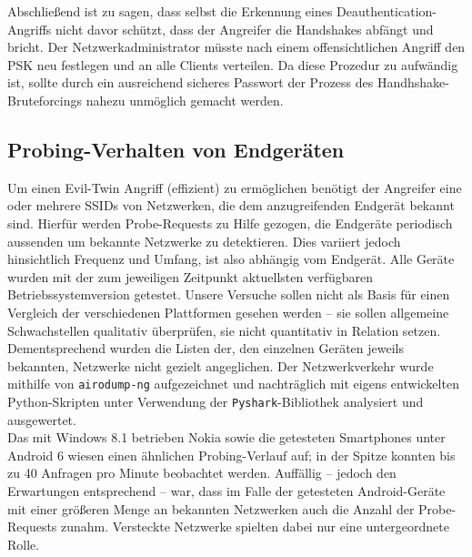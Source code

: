 Abschließend ist zu sagen, dass selbst die Erkennung eines Deauthentication-Angriffs nicht davor schützt, dass der Angreifer die Handshakes abfängt und bricht.
Der Netzwerkadministrator müsste nach einem offensichtlichen Angriff den PSK neu festlegen und an alle Clients verteilen.
Da diese Prozedur zu aufwändig ist, sollte durch ein ausreichend sicheres Passwort der Prozess des Handhshake-Bruteforcings nahezu unmöglich gemacht werden.




\subsection{Probing-Verhalten von Endgeräten}\label{subs:praxisprobes}
Um einen Evil-Twin Angriff (effizient) zu ermöglichen benötigt der Angreifer eine oder mehrere SSIDs von Netzwerken, die dem anzugreifenden Endgerät bekannt sind.
Hierfür werden Probe-Requests zu Hilfe gezogen, die Endgeräte periodisch aussenden um bekannte Netzwerke zu detektieren.
Dies variiert jedoch hinsichtlich Frequenz und Umfang, ist also abhängig vom Endgerät.
Alle Geräte wurden mit der zum jeweiligen Zeitpunkt aktuellsten verfügbaren Betriebssystemversion getestet. Unsere Versuche sollen nicht als Basis für einen Vergleich der verschiedenen Plattformen gesehen werden -- sie sollen allgemeine Schwachstellen qualitativ überprüfen, sie nicht quantitativ in Relation setzen. Dementsprechend wurden die Listen der, den einzelnen Geräten jeweils bekannten, Netzwerke nicht gezielt angeglichen. Der Netzwerkverkehr wurde mithilfe von \texttt{airodump-ng} aufgezeichnet und nachträglich mit eigens entwickelten Python-Skripten unter Verwendung der \texttt{Pyshark}-Bibliothek analysiert und ausgewertet.\\

Das mit Windows 8.1 betrieben Nokia sowie die getesteten Smartphones unter Android 6 wiesen einen ähnlichen Probing-Verlauf auf; in der Spitze konnten bis zu 40 Anfragen pro Minute beobachtet werden.
Auffällig -- jedoch den Erwartungen entsprechend -- war, dass im Falle der getesteten Android-Geräte mit einer größeren Menge an bekannten Netzwerken auch die Anzahl der Probe-Requests zunahm. Versteckte Netzwerke spielten dabei nur eine untergeordnete Rolle.\\

